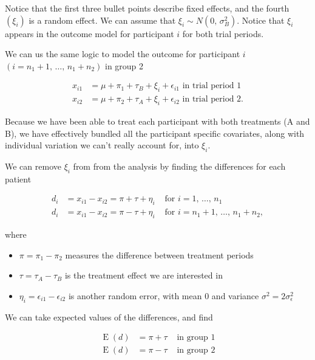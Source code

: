 \documentclass[
  openany]{book}
\providecommand{\tightlist}{%
  \setlength{\itemsep}{0pt}\setlength{\parskip}{0pt}}
\theoremstyle{definition}
\theoremstyle{definition}
\theoremstyle{definition}
\theoremstyle{definition}
\theoremstyle{remark}
\begin{document}
Notice that the first three bullet points describe fixed effects, and the fourth \((\xi_i)\) is a random effect. We can assume that \(\xi_i \sim N\left(0,\,\sigma_B^2\right)\). Notice that \(\xi_i\) appears in the outcome model for participant \(i\) for both trial periods.

We can us the same logic to model the outcome for participant \(i\) \(\left(i=n_1+1,\,\ldots,\,n_1+n_2\right)\) in group 2

\begin{align*}
x_{i1} & = \mu + \pi_1 + \tau_B + \xi_i + \epsilon_{i1} \text{ in trial period 1}\\
x_{i2} & = \mu + \pi_2 + \tau_A + \xi_i + \epsilon_{i2} \text{ in trial period 2.}
\end{align*}

Because we have been able to treat each participant with both treatments (A and B), we have effectively bundled all the participant specific covariates, along with individual variation we can't really account for, into \(\xi_i\).

We can remove \(\xi_i\) from from the analysis by finding the differences for each patient

\begin{align*}
d_i & = x_{i1} - x_{i2} = \pi + \tau + \eta_i& \text{ for } i=1,\,\ldots,\,n_1\\
d_i & = x_{i1} - x_{i2} = \pi - \tau + \eta_i& \text{ for } i=n_1+1,\,\ldots,\,n_1+n_2,
\end{align*}

where

\begin{itemize}
\tightlist
\item
  \(\pi=\pi_1 - \pi_2\) measures the difference between treatment periods
\item
  \(\tau = \tau_A - \tau_B\) is the treatment effect we are interested in
\item
  \(\eta_i = \epsilon_{i1} - \epsilon_{i2}\) is another random error, with mean 0 and variance \(\sigma^2=2\sigma^2_{\epsilon}\)
\end{itemize}

We can take expected values of the differences, and find

\begin{align*}
\operatorname{E}\left(d\right) & = \pi+\tau & \text{ in group 1}\\
\operatorname{E}\left(d\right) & = \pi-\tau & \text{ in group 2}
\end{align*}
\end{document}
